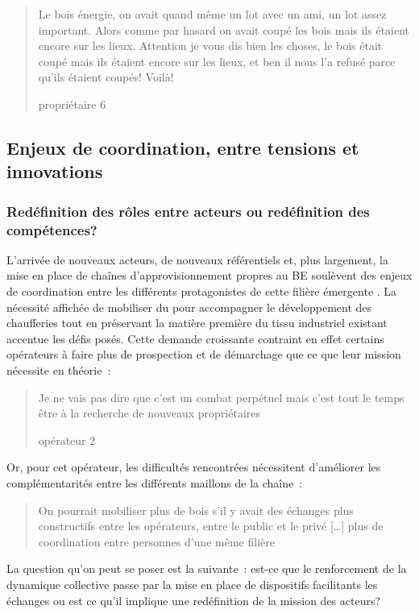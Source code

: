 \documentclass[12pt]{report}
\begin{document}
\blockquote[propriétaire 6]{Le bois énergie, on avait
  quand même un lot avec un ami, un lot assez important. Alors comme par hasard
  on avait coupé les bois mais ils étaient encore sur les lieux. Attention je
  vous dis bien les choses, le bois était coupé mais ils étaient encore sur les
  lieux, et ben il nous l'a refusé parce qu'ils étaient coupés! Voilà!}

\subsection{Enjeux de coordination, entre tensions et innovations}

\subsubsection{Redéfinition des rôles entre acteurs ou redéfinition des compétences?}

L’arrivée de nouveaux acteurs, de nouveaux référentiels et, plus largement, la
mise en place de chaînes d’approvisionnement propres au BE soulèvent des enjeux
de coordination entre les différents protagonistes de cette filière émergente
\citep{tabourdeau2014_ref117,BEbanosDehez_ref78}. La nécessité affichée de mobiliser
du  pour accompagner le développement des chaufferies
tout en préservant la matière première du tissu industriel existant accentue les
défis posés. Cette demande croissante contraint en effet certains opérateurs
à faire plus de prospection et de
démarchage que ce que leur mission nécessite en théorie~: \blockquote[opérateur 2]
{Je ne vais pas dire que c’est un combat perpétuel mais c’est tout
le temps être à la recherche de nouveaux propriétaires}. Or, pour
cet opérateur, les difficultés rencontrées nécessitent d’améliorer les
complémentarités entre les différents maillons de la chaîne~: \blockquote{On pourrait
mobiliser plus de bois s’il y avait des échanges plus constructifs entre les
opérateurs, entre le public et le privé [\ldots] plus de coordination entre personnes
d’une même filière}. La question qu’on peut se poser est la
suivante : est-ce que le renforcement de la dynamique collective passe par la
mise en place de dispositifs facilitants les échanges ou est ce qu’il implique
une redéfinition de la mission des acteurs?\\
\end{document}
